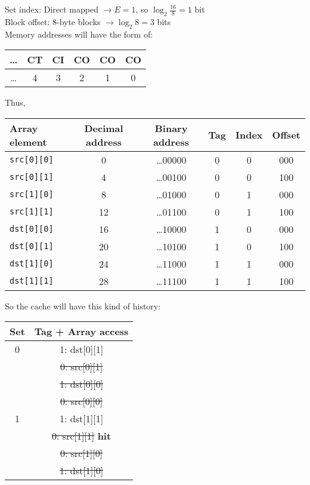 \documentclass{article}
\begin{document}
\noindent
Set index: Direct mapped $\rightarrow E = 1$, so $\log_2 \frac{16}{8} = 1$ bit \\
\noindent
Block offset: 8-byte blocks $\rightarrow \log_2 8 = 3$ bits \\
\noindent
Memory addresses will have the form of: \\

\begin{center}
    \begin{tabular}{|c|c|c|c|c|c|}
        \hline
        \ldots & CT & CI & CO & CO & CO \\
        \hline
        \ldots & 4 & 3 & 2 & 1 & 0 \\
        \hline
    \end{tabular}
\end{center}

\noindent Thus,
\begin{center}
    \begin{tabular}{|l|c|c|c|c|c|}
        \hline
        Array element & Decimal address & Binary address & Tag & Index & Offset \\
        \hline
        \texttt{src[0][0]} & 0 & \ldots 00000 & 0 & 0 & 000 \\
        \texttt{src[0][1]} & 4 & \ldots 00100 & 0 & 0 & 100 \\
        \texttt{src[1][0]} & 8 & \ldots 01000 & 0 & 1 & 000 \\
        \texttt{src[1][1]} & 12 & \ldots 01100 & 0 & 1 & 100 \\
        \texttt{dst[0][0]} & 16 & \ldots 10000 & 1 & 0 & 000 \\
        \texttt{dst[0][1]} & 20 & \ldots 10100 & 1 & 0 & 100 \\
        \texttt{dst[1][0]} & 24 & \ldots 11000 & 1 & 1 & 000 \\
        \texttt{dst[1][1]} & 28 & \ldots 11100 & 1 & 1 & 100 \\
        \hline
    \end{tabular}
\end{center}

\noindent So the cache will have this kind of history:
\begin{center}
    \begin{tabular}{|c|c|}
        \hline
        Set & Tag + Array access \\
        \hline
        0 & 1: dst[0][1] \\
        & \sout{0: src[0][1]} \\
        & \sout{1: dst[0][0]} \\
        & \sout{0: src[0][0]} \\
        \hline
        1 & 1: dst[1][1] \\
        & \sout{0: src[1][1]} \textbf{hit} \\
        & \sout{0: src[1][0]} \\
        & \sout{1: dst[1][0]} \\
        \hline
    \end{tabular}
\end{center}
\end{document}
